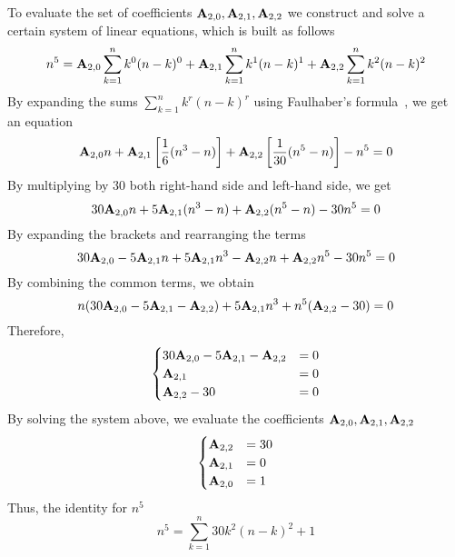 To evaluate the set of coefficients ${\mathbf{A}} \sb{2,0}, {\mathbf{A}} \sb{2,1}, {\mathbf{A}} \sb{2,2}$
we construct and solve a certain system of linear equations, which is
built as follows
\begin{align*}
    n^5 = {\mathbf{A}} \sb{2,0} \sum_{k=1}^{n} k^0 (n-k)^0 + {\mathbf{A}} \sb{2,1} \sum_{k=1}^{n} k^1 (n-k)^1 + {\mathbf{A}} \sb{2,2} \sum_{k=1}^{n} k^2 (n-k)^2
\end{align*}
By expanding the sums $\sum_{k=1}^{n} k^r (n-k)^r$ using Faulhaber's formula~\cite{beardon1996sums}, we get
an equation
\begin{equation*}
    {\mathbf{A}} \sb{2,0} n
    + {\mathbf{A}} \sb{2,1} \left[ \frac{1}{6} (n^3-n) \right]
    + {\mathbf{A}} \sb{2,2} \left[ \frac{1}{30} (n^5-n) \right] - n^5 = 0
\end{equation*}
By multiplying by $30$ both right-hand side and left-hand side, we get
\begin{equation*}
    30 {\mathbf{A}} \sb{2,0} n + 5 {\mathbf{A}} \sb{2,1} (n^3-n) + {\mathbf{A}} \sb{2,2} (n^5-n) - 30n^5 = 0
\end{equation*}
By expanding the brackets and rearranging the terms
\begin{equation*}
    30 {\mathbf{A}} \sb{2,0} - 5 {\mathbf{A}} \sb{2,1} n + 5 {\mathbf{A}} \sb{2,1} n^3 - {\mathbf{A}} \sb{2,2} n + {\mathbf{A}} \sb{2,2} n^5 - 30n^5 = 0
\end{equation*}
By combining the common terms, we obtain
\begin{equation*}
    n (30 {\mathbf{A}} \sb{2,0} - 5 {\mathbf{A}} \sb{2,1} - {\mathbf{A}} \sb{2,2}) + 5 {\mathbf{A}} \sb{2,1} n^3 + n^5 ({\mathbf{A}} \sb{2,2} - 30) = 0
\end{equation*}
Therefore,
\begin{equation*}
    \begin{cases}
        30 {\mathbf{A}} \sb{2,0} - 5 {\mathbf{A}} \sb{2,1} - {\mathbf{A}} \sb{2,2} &= 0 \\
        {\mathbf{A}} \sb{2,1} &= 0 \\
        {\mathbf{A}} \sb{2,2} - 30 &= 0
    \end{cases}
\end{equation*}
By solving the system above, we evaluate the coefficients ${\mathbf{A}} \sb{2,0}, {\mathbf{A}} \sb{2,1}, {\mathbf{A}} \sb{2,2}$
\begin{equation*}
    \begin{cases}
        {\mathbf{A}} \sb{2,2} &= 30 \\
        {\mathbf{A}} \sb{2,1} &= 0 \\
        {\mathbf{A}} \sb{2,0} &= 1
    \end{cases}
\end{equation*}
Thus, the identity for $n^5$
\begin{equation*}
    n^5 = \sum_{k=1}^{n} 30k^2(n-k)^2 + 1
\end{equation*}
